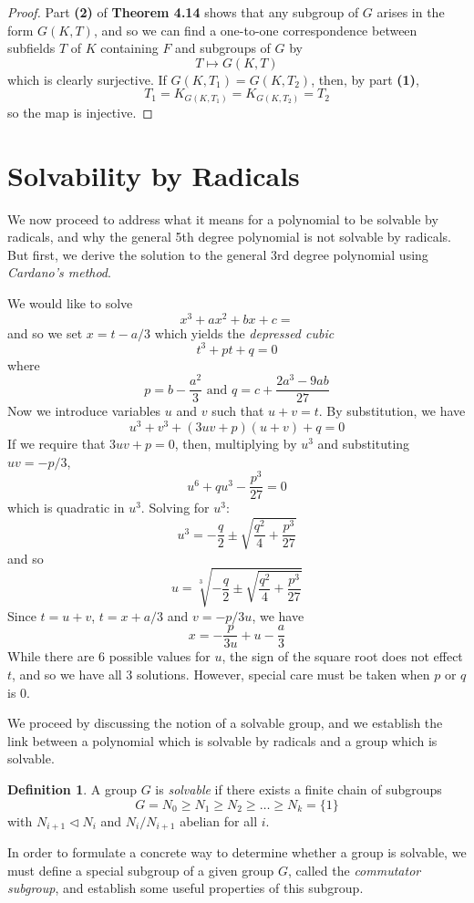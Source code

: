 \documentclass[12pt,leqno]{article}
\numberwithin{equation}{section}
\theoremstyle{plain}
\theoremstyle{definition}
\newtheorem*{Def}{Definition}
\theoremstyle{remark}
\begin{document}
\begin{proof}
 Part \textbf{(2)} of \textbf{Theorem 4.14} shows that any subgroup of $G$ arises in the form $G(K,T)$, and so we can find a one-to-one correspondence between subfields $T$ of $K$ containing $F$ and subgroups of $G$ by \[T\mapsto G(K,T)\] which is clearly surjective. If $G(K,T_1)=G(K,T_2)$, then, by part \textbf{(1)}, \[T_1=K_{G(K,T_1)}=K_{G(K,T_2)}=T_2\] so the map is injective. 
\end{proof}

\section{Solvability by Radicals}
We now proceed to address what it means for a polynomial to be solvable by radicals, and why the general 5th degree polynomial is not solvable by radicals. But first, we derive the solution to the general 3rd degree polynomial using \textit{Cardano's method}.

We would like to solve \[x^3+ax^2+bx+c=\] and so we set $x=t-a/3$ which yields the \textit{depressed cubic}\[t^3+pt+q=0\] where \[p=b-\frac{a^2}{3}\text{ and }q=c+\frac{2a^3-9ab}{27}\] Now we introduce variables $u$ and $v$ such that $u+v=t$. By substitution, we have \[u^3+v^3+(3uv+p)(u+v)+q=0\] If we require that $3uv+p=0$, then, multiplying by $u^3$ and substituting $uv=-p/3$, \[u^6+qu^3-\frac{p^3}{27}=0\] which is quadratic in $u^3$. Solving for $u^3$:\[u^3=-\frac{q}{2}\pm\sqrt{\frac{q^2}{4}+\frac{p^3}{27}}\] and so \[u=\sqrt[3]{-\frac{q}{2}\pm\sqrt{\frac{q^2}{4}+\frac{p^3}{27}}}\] Since $t=u+v$, $t=x+a/3$ and $v=-p/3u$, we have \[x=-\frac{p}{3u}+u-\frac{a}{3}\] While there are 6 possible values for $u$, the sign of the square root does not effect $t$, and so we have all 3 solutions. However, special care must be taken when $p$ or $q$ is 0.

We proceed by discussing the notion of a solvable group, and we establish the link between a polynomial which is solvable by radicals and a group which is solvable.

\begin{Def}
 A group $G$ is \textit{solvable} if there exists a finite chain of subgroups\[G=N_0\geq N_1\geq N_2\geq\hdots\geq N_k=\{1\}\] with $N_{i+1}\lhd N_i$ and $N_i/N_{i+1}$ abelian for all $i$.
\end{Def}

In order to formulate a concrete way to determine whether a group is solvable, we must define a special subgroup of a given group $G$, called the \textit{commutator subgroup}, and establish some useful properties of this subgroup.
\end{document}
